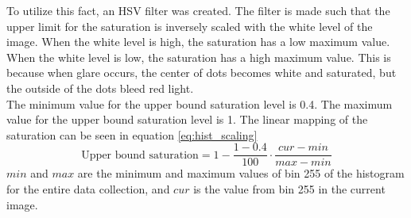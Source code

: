To utilize this fact, an HSV filter was created. The filter is made such that the upper limit for the saturation is inversely scaled with the white level of the image. When the white level is high, the saturation has a low maximum value. When the white level is low, the saturation has a high maximum value. 
This is because when glare occurs, the center of dots becomes white and saturated, but the outside of the dots bleed red light.\\


The minimum value for the upper bound saturation level is 0.4. The maximum value for the upper bound saturation level is 1. The linear mapping of the saturation can be seen in equation \ref{eq:hist_scaling}
\begin{equation}
    \text{Upper bound saturation} = 1-\frac{1-0.4}{100} \cdot \frac{cur-min}{max-min}
    \label{eq:hist_scaling}
\end{equation}
$min$ and $max$ are the minimum and maximum values of bin 255 of the histogram for the entire data collection, and $cur$ is the value from bin 255 in the current image. \\

